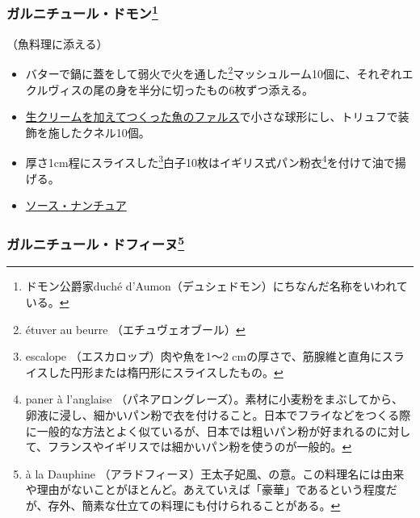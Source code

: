 \begin{recette}
\hypertarget{garniture-Daumont}{%
\subsubsection[ガルニチュール・ドモン]{\texorpdfstring{ガルニチュール・ドモン\footnote{ドモン公爵家duché
  d'Aumon（デュシェドモン）にちなんだ名称をいわれている。}}{ガルニチュール・ドモン}}\label{garniture-Daumont}}



（魚料理に添える）

\begin{itemize}
\item
  バターで鍋に蓋をして弱火で火を通した\footnote{étuver au beurre
    （エチュヴェオブール）}マッシュルーム10個に、それぞれエクルヴィスの尾の身を半分に切ったもの6枚ずつ添える。
\item
  \protect\hyperlink{farce-c}{生クリームを加えてつくった魚のファルス}で小さな球形にし、トリュフで装飾を施したクネル10個。
\item
  厚さ1cm程にスライスした\footnote{escalope （エスカロップ）肉や魚を1〜2
    cmの厚さで、筋腺維と直角にスライスした円形または楕円形にスライスしたもの。}白子10枚はイギリス式パン粉衣\footnote{paner
    à l'anglaise
    （パネアロングレーズ）。素材に小麦粉をまぶしてから、卵液に浸し、細かいパン粉で衣を付けること。日本でフライなどをつくる際に一般的な方法とよく似ているが、日本では粗いパン粉が好まれるのに対して、フランスやイギリスでは細かいパン粉を使うのが一般的。}を付けて油で揚げる。
\item
  \protect\hyperlink{sauce-nantua}{ソース・ナンチュア}
\end{itemize}

\hypertarget{garniture-a-la-dauphine}{%
\subsubsection[ガルニチュール・ドフィーヌ]{\texorpdfstring{ガルニチュール・ドフィーヌ\footnote{à
  la Dauphine
  （アラドフィーヌ）王太子妃風、の意。この料理名には由来や理由がないことがほとんど。あえていえば「豪華」であるという程度だが、存外、簡素な仕立ての料理にも付けられることがある。}}{ガルニチュール・ドフィーヌ}}\label{garniture-a-la-dauphine}}



\end{recette}

